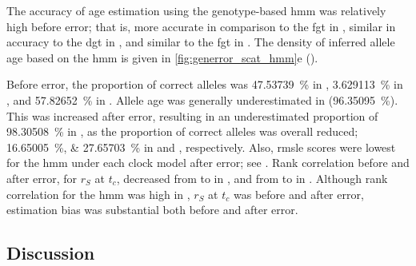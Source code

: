 %

%

The accuracy of age estimation using the genotype-based \gls{hmm} was relatively high before error; that is, more accurate in comparison to the \gls{fgt} in \ClockM, similar in accuracy to the \gls{dgt} in \ClockR, and similar to the \gls{fgt} in \ClockC.
The density of inferred allele age based on the \gls{hmm} is given in \cref{fig:generror_scat_hmm}{e} ().

Before error, the proportion of correct alleles was \SI{47.53739}{\percent} in \ClockM, \SI{3.629113}{\percent} in \ClockR, and \SI{57.82652}{\percent} in \ClockC.
Allele age was generally underestimated in \ClockR (\SI{96.35095}{\percent}).
This was increased after error, resulting in an underestimated proportion of \SI{98.30508}{\percent} in \ClockR, as the proportion of correct alleles was overall reduced; \SIlist{16.65005;27.65703}{\percent} in \ClockM and \ClockC, respectively.
Also, \gls{rmsle} scores were lowest for the \gls{hmm} under each clock model after error; see .
Rank correlation before and after error, for $r_S$ at $t_c$, decreased from  to  in \ClockM, and from  to  in \ClockC.
Although rank correlation for the \gls{hmm} was high in \ClockR, \eg $r_S$ at $t_c$ was  before and  after error, estimation bias was substantial both before and after error.

% 
%


%

%




%
\subsection{Discussion}
%




